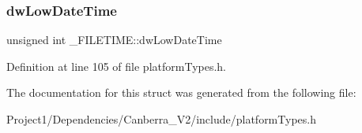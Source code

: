 \mbox{\label{struct___f_i_l_e_t_i_m_e_aefb0835cecf5918f0633847df1a98ca6}} 
\subsubsection{\texorpdfstring{dw\+Low\+Date\+Time}{dwLowDateTime}}
{\footnotesize\ttfamily unsigned int \+\_\+\+F\+I\+L\+E\+T\+I\+M\+E\+::dw\+Low\+Date\+Time}



Definition at line 105 of file platform\+Types.\+h.



The documentation for this struct was generated from the following file\+:\begin{DoxyCompactItemize}
\item 
Project1/\+Dependencies/\+Canberra\+\_\+\+V2/include/platform\+Types.\+h\end{DoxyCompactItemize}
